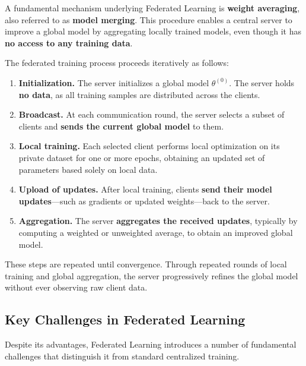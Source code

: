 A fundamental mechanism underlying Federated Learning is \textbf{weight averaging}, also
referred to as \textbf{model merging}. This procedure enables a central server to improve a
global model by aggregating locally trained models, even though it has \textbf{no access to
any training data}.

The federated training process proceeds iteratively as follows:

\begin{enumerate}
    \item \textbf{Initialization.}  
    The server initializes a global model $\theta^{(0)}$. The server holds \textbf{no data},
    as all training samples are distributed across the clients.

    \item \textbf{Broadcast.}  
    At each communication round, the server selects a subset of clients and \textbf{sends
    the current global model} to them.

    \item \textbf{Local training.}  
    Each selected client performs local optimization on its private dataset for one or more
    epochs, obtaining an updated set of parameters based solely on local data.

    \item \textbf{Upload of updates.}  
    After local training, clients \textbf{send their model updates}—such as gradients or
    updated weights—back to the server.

    \item \textbf{Aggregation.}  
    The server \textbf{aggregates the received updates}, typically by computing a weighted
    or unweighted average, to obtain an improved global model.

\end{enumerate}

These steps are repeated until convergence. Through repeated rounds of local training and
global aggregation, the server progressively refines the global model without ever
observing raw client data.


\subsection{Key Challenges in Federated Learning}

Despite its advantages, Federated Learning introduces a number of fundamental challenges
that distinguish it from standard centralized training.


